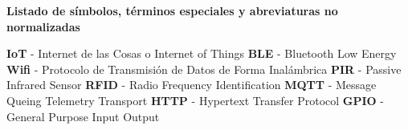 \renewcommand{\thepage}{\Roman{page}}
    \textbf{\Large Listado de símbolos, términos especiales y abreviaturas no normalizadas}\newline

    \textbf{IoT} - Internet de las Cosas o Internet of Things
    \newline
    \textbf{BLE} - Bluetooth Low Energy
    \newline
    \textbf{Wifi} - Protocolo de Transmisión de Datos de Forma Inalámbrica
    \newline
    \textbf{PIR} - Passive Infrared Sensor
    \newline
    \textbf{RFID} - Radio Frequency Identification
    \newline
    \textbf{MQTT} - Message Queing Telemetry Transport
    \newline
    \textbf{HTTP} - Hypertext Transfer Protocol
    \newline
    \textbf{GPIO} - General Purpose Input Output
    
    \setcounter{page}{1}
    \thispagestyle{plain}